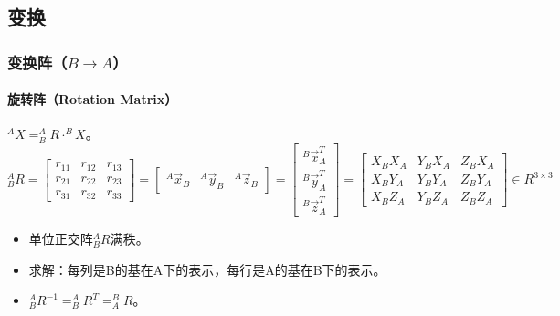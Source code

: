 \documentclass[
12pt, %
a4paper, 
oneside, %
headinclude,footinclude, %
]{scrartcl}
\begin{document}
\subsection{变换}
\subsubsection{变换阵（$ B \to A $）}
\paragraph{旋转阵（Rotation Matrix）}
$ ^A X = ^A_B R \cdot ^B X $。
$$ 
^A_B R 
= \begin{bmatrix} r_{11} & r_{12} & r_{13} \\ r_{21} & r_{22} & r_{23} \\ r_{31} & r_{32} & r_{33} \end{bmatrix}
= \begin{bmatrix} ^A \vec x_B & ^A \vec y_B & ^A \vec z_B \end{bmatrix}
= \begin{bmatrix} ^B \vec x_A^T \\ ^B \vec y_A^T \\ ^B \vec z_A^T \end{bmatrix}
= \begin{bmatrix} X_BX_A & Y_BX_A & Z_BX_A \\ X_BY_A & Y_BY_A & Z_BY_A \\ X_BZ_A & Y_BZ_A & Z_BZ_A \end{bmatrix}
\in R^{3 \times 3}
$$
\begin{itemize}
\item 单位正交阵$ ^A_B R $满秩。
\item 求解：每列是B的基在A下的表示，每行是A的基在B下的表示。
\item $ ^A_B R^{-1} = ^A_B R^T = ^B_A R $。
\end{itemize}
\end{document}
